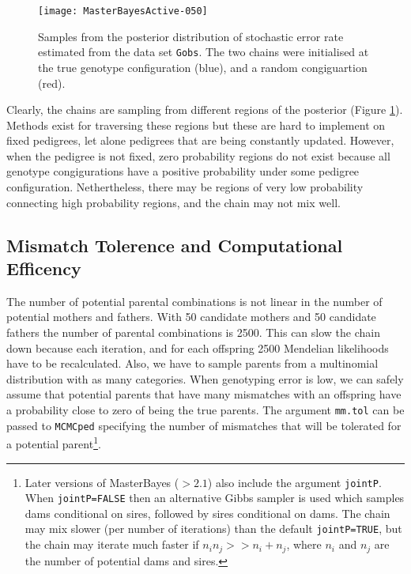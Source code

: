 \documentclass{article}
\begin{document}
\begin{figure}[!h]
\begin{center}
\texttt{[image: MasterBayesActive-050]}
\end{center}
\caption{Samples from the posterior distribution of stochastic error rate estimated from the data set \texttt{Gobs}. The two chains were initialised at the true genotype configuration (blue), and a random congiguartion (red).} 
\label{E2DS-fig}
\end{figure}

Clearly, the chains are sampling from different regions of the posterior (Figure \ref{E2DS-fig}).  Methods exist for traversing these regions \citep{Sheehan.2000, Lange.2002} but these are hard to implement on fixed pedigrees, let alone pedigrees that are being constantly updated.  However, when the pedigree is not fixed, zero probability regions do not exist because all genotype congigurations have a positive probability under some pedigree configuration.  Nethertheless, there may be regions of very low probability connecting high probability regions, and the chain may not mix well.  

\subsection{Mismatch Tolerence and Computational Efficency}

The number of potential parental combinations is not linear in the number of potential mothers and fathers.  With 50 candidate mothers and 50 candidate fathers the number of parental combinations is 2500.  This can slow the chain down because each iteration, and for each offspring 2500 Mendelian likelihoods have to be recalculated.  Also, we have to sample parents from a multinomial distribution with as many categories.  When genotyping error is low, we can safely assume that potential parents that have many mismatches with an offspring have a probability close to zero of being the true parents.  The argument \texttt{mm.tol} can be passed to \texttt{MCMCped} specifying the number of mismatches that will be tolerated for a potential parent\footnote{Later versions of MasterBayes ($>2.1$) also include the argument \texttt{jointP}. When \texttt{jointP=FALSE} then an alternative Gibbs sampler is used which samples dams conditional on sires, followed by sires conditional on dams.  The chain may mix slower (per number of iterations) than the default \texttt{jointP=TRUE}, but the chain may iterate much faster if $n_{i}n_{j}>>n_{i}+n_{j}$, where $n_{i}$ and $n_{j}$ are the number of potential dams and sires.}.\\
\end{document}
